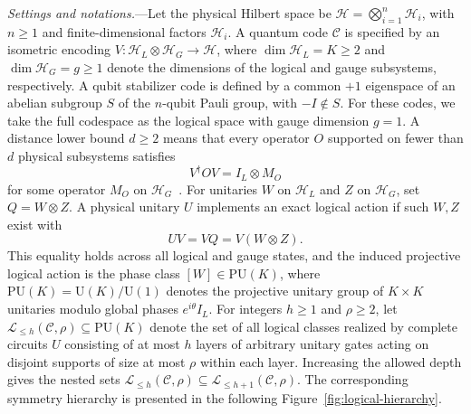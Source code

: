\documentclass[aps,prl,reprint,notitlepage,nofootinbib,nobibnotes]{revtex4-2}
\newcommand{\HH}{\mathcal H}
\newcommand{\UU}{\mathrm U}
\newcommand{\PU}{\mathrm{PU}}
\newcommand{\id}{I}
\begin{document}
\textit{Settings and notations.}---Let the physical Hilbert space be
$\HH=\bigotimes_{i=1}^{n}\HH_i$, with $n\ge1$ and finite-dimensional factors $\HH_i$. A quantum
code $\mathcal C$ is specified by an isometric encoding $V:\HH_L\otimes\HH_G\longrightarrow\HH$,
where $\dim\HH_L=K\ge2$ and $\dim\HH_G=g\ge1$ denote the dimensions of the logical and gauge
subsystems, respectively. A qubit stabilizer code is defined by a common $+1$
eigenspace of an abelian subgroup $S$ of the $n$-qubit Pauli group,
with $-\id\notin S$. For these codes, we take the full codespace as
the logical space with gauge dimension $g=1$. A distance lower bound
$d\ge 2$ means that every operator $O$ supported on fewer than $d$ physical subsystems satisfies
\begin{equation}\label{eq:correctable}
  V^\dagger O V=\id_L\otimes M_O
\end{equation}
for some operator $M_O$ on $\HH_G$~\cite{KL,Kribs,Poulin}. For unitaries $W$ on $\HH_L$ and $Z$ on
$\HH_G$, set $Q=W\otimes Z$. A physical unitary $U$ implements an exact logical action if such
$W,Z$ exist with
\begin{equation}\label{eq:encoded}
  UV=VQ=V(W\otimes Z).
\end{equation}
This equality holds across all logical and gauge states, and the induced projective logical action
is the phase class $[W]\in\PU(K)$, where $\PU(K)=\UU(K)/\UU(1)$ denotes the projective unitary
group of $K\times K$ unitaries modulo global phases $e^{i\theta}\id_L$. For integers $h\ge1$ and
$\rho\ge2$, let $\mathcal L_{\le h}(\mathcal C,\rho)\subseteq\PU(K)$ denote the set of all logical
classes realized by complete circuits $U$ consisting of at most $h$ layers of arbitrary unitary
gates acting on disjoint supports of size at most $\rho$ within each layer. Increasing the allowed depth gives the nested sets $\mathcal L_{\le h}(\mathcal
C,\rho)\subseteq\mathcal L_{\le h+1}(\mathcal C,\rho)$. The corresponding symmetry hierarchy is presented in the following Figure~\ref{fig:logical-hierarchy}.
\end{document}
